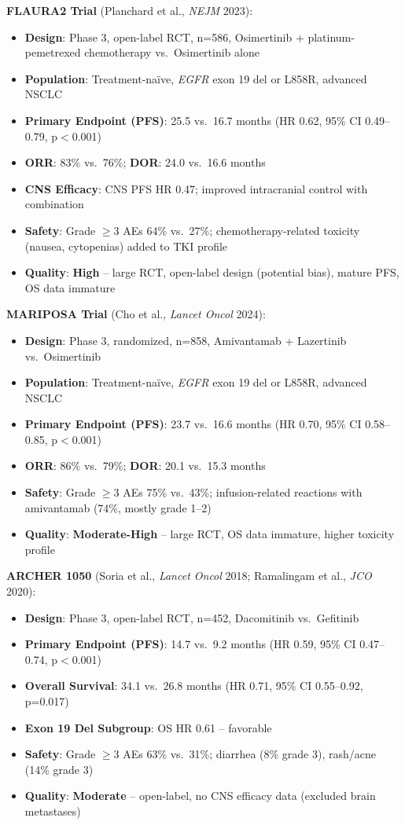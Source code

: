 \documentclass[10pt,letterpaper]{article}
\begin{document}
\textbf{FLAURA2 Trial} (Planchard et al., \textit{NEJM} 2023):
\begin{itemize}
\item \textbf{Design}: Phase 3, open-label RCT, n=586, Osimertinib + platinum-pemetrexed chemotherapy vs.~Osimertinib alone
\item \textbf{Population}: Treatment-na\"ive, \textit{EGFR} exon 19 del or L858R, advanced NSCLC
\item \textbf{Primary Endpoint (PFS)}: 25.5 vs.~16.7 months (HR 0.62, 95\% CI 0.49--0.79, p$<$0.001)
\item \textbf{ORR}: 83\% vs.~76\%; \textbf{DOR}: 24.0 vs.~16.6 months
\item \textbf{CNS Efficacy}: CNS PFS HR 0.47; improved intracranial control with combination
\item \textbf{Safety}: Grade $\geq$3 AEs 64\% vs.~27\%; chemotherapy-related toxicity (nausea, cytopenias) added to TKI profile
\item \textbf{Quality}: \textbf{High} -- large RCT, open-label design (potential bias), mature PFS, OS data immature
\end{itemize}

\textbf{MARIPOSA Trial} (Cho et al., \textit{Lancet Oncol} 2024):
\begin{itemize}
\item \textbf{Design}: Phase 3, randomized, n=858, Amivantamab + Lazertinib vs.~Osimertinib
\item \textbf{Population}: Treatment-na\"ive, \textit{EGFR} exon 19 del or L858R, advanced NSCLC
\item \textbf{Primary Endpoint (PFS)}: 23.7 vs.~16.6 months (HR 0.70, 95\% CI 0.58--0.85, p$<$0.001)
\item \textbf{ORR}: 86\% vs.~79\%; \textbf{DOR}: 20.1 vs.~15.3 months
\item \textbf{Safety}: Grade $\geq$3 AEs 75\% vs.~43\%; infusion-related reactions with amivantamab (74\%, mostly grade 1--2)
\item \textbf{Quality}: \textbf{Moderate-High} -- large RCT, OS data immature, higher toxicity profile
\end{itemize}

\textbf{ARCHER 1050} (Soria et al., \textit{Lancet Oncol} 2018; Ramalingam et al., \textit{JCO} 2020):
\begin{itemize}
\item \textbf{Design}: Phase 3, open-label RCT, n=452, Dacomitinib vs.~Gefitinib
\item \textbf{Primary Endpoint (PFS)}: 14.7 vs.~9.2 months (HR 0.59, 95\% CI 0.47--0.74, p$<$0.001)
\item \textbf{Overall Survival}: 34.1 vs.~26.8 months (HR 0.71, 95\% CI 0.55--0.92, p=0.017)
\item \textbf{Exon 19 Del Subgroup}: OS HR 0.61 -- favorable
\item \textbf{Safety}: Grade $\geq$3 AEs 63\% vs.~31\%; diarrhea (8\% grade 3), rash/acne (14\% grade 3)
\item \textbf{Quality}: \textbf{Moderate} -- open-label, no CNS efficacy data (excluded brain metastases)
\end{itemize}
\end{document}
